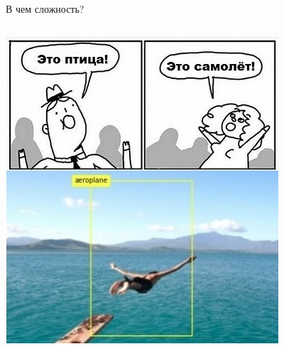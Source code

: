 \documentclass[aspectratio=169]{beamer}
\begin{document}
\begin{frame}{В чем сложность?}
\begin{columns}
        \pause{}
        \begin{column}{.33\linewidth}
            \includegraphics[width=\linewidth]{graphs/fig4_2.jpg}
        \end{column}
    \end{columns}
\end{frame}
\end{document}
